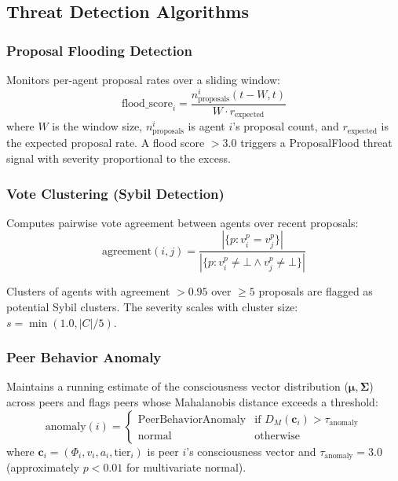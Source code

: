 \documentclass[11pt,a4paper]{article}
\begin{document}
\subsection{Threat Detection Algorithms}

\subsubsection{Proposal Flooding Detection}

Monitors per-agent proposal rates over a sliding window:
\begin{equation}
\text{flood\_score}_i = \frac{n_{\text{proposals}}^i(t - W, t)}{W \cdot r_{\text{expected}}}
\end{equation}
where $W$ is the window size, $n_{\text{proposals}}^i$ is agent $i$'s proposal count, and $r_{\text{expected}}$ is the expected proposal rate. A flood score $> 3.0$ triggers a ProposalFlood threat signal with severity proportional to the excess.

\subsubsection{Vote Clustering (Sybil Detection)}

Computes pairwise vote agreement between agents over recent proposals:
\begin{equation}
\text{agreement}(i, j) = \frac{|\{p : v_i^p = v_j^p\}|}{|\{p : v_i^p \neq \bot \wedge v_j^p \neq \bot\}|}
\end{equation}

Clusters of agents with agreement $> 0.95$ over $\geq 5$ proposals are flagged as potential Sybil clusters. The severity scales with cluster size: $s = \min(1.0, |C| / 5)$.

\subsubsection{Peer Behavior Anomaly}

Maintains a running estimate of the consciousness vector distribution ($\boldsymbol{\mu}, \boldsymbol{\Sigma}$) across peers and flags peers whose Mahalanobis distance exceeds a threshold:
\begin{equation}
\text{anomaly}(i) = \begin{cases}
\text{PeerBehaviorAnomaly} & \text{if } D_M(\mathbf{c}_i) > \tau_{\text{anomaly}} \\
\text{normal} & \text{otherwise}
\end{cases}
\end{equation}
where $\mathbf{c}_i = (\Phi_i, v_i, a_i, \text{tier}_i)$ is peer $i$'s consciousness vector and $\tau_{\text{anomaly}} = 3.0$ (approximately $p < 0.01$ for multivariate normal).
\end{document}
